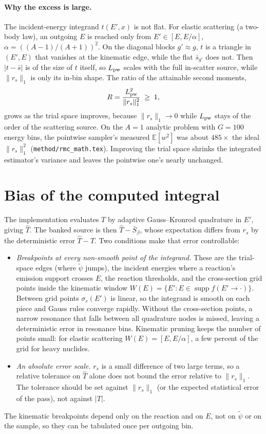 \documentclass[11pt]{article}
\newcommand{\tpsi}{\tilde\psi}
\newcommand{\Sbar}{\bar S}
\newcommand{\E}{\mathbb{E}}
\begin{document}
\paragraph{Why the excess is large.} The incident-energy integrand $t(E',x)$ is not flat.
For elastic scattering (a two-body law), an outgoing $E$ is reached only from
$E'\in[E, E/\alpha]$, $\alpha = ((A-1)/(A+1))^2$. On the diagonal blocks $g'\approx g$,
$t$ is a triangle in $(E',E)$ that vanishes at the kinematic edge, while the flat
$\bar s_{g'}$ does not. Then $|t-\bar s|$ is of the size of $t$ itself, so
$L_{\rm pw}$ scales with the full in-scatter source, while $\|r_s\|_1$ is only its
in-bin shape. The ratio of the attainable second moments,
\begin{equation}
  R = \frac{L_{\rm pw}^2}{\|r_s\|_1^2} \;\ge\; 1,
\end{equation}
grows as the trial space improves, because $\|r_s\|_1\to 0$ while $L_{\rm pw}$ stays
of the order of the scattering source. On the $A=1$ analytic problem with $G=100$
energy bins, the pointwise sampler's measured $\E[w^2]$ was about $485\times$ the ideal
$\|r_s\|_1^2$ (\texttt{method/rmc\_math.tex}). Improving the trial space shrinks the
integrated estimator's variance and leaves the pointwise one's nearly unchanged.

\section{Bias of the computed integral}

The implementation evaluates $T$ by adaptive Gauss--Kronrod quadrature in $E'$, giving
$\widehat T$. The banked source is then $\widehat T - \Sbar_\beta$, whose expectation
differs from $r_s$ by the deterministic error $\widehat T - T$. Two conditions make that
error controllable:
\begin{itemize}
  \item \emph{Breakpoints at every non-smooth point of the integrand.} These are the
  trial-space edges (where $\tpsi$ jumps), the incident energies where a reaction's
  emission support crosses $E$, the reaction thresholds, and the cross-section grid
  points inside the kinematic window $W(E)=\{E' : E\in\operatorname{supp}
  f(E'\to\cdot)\}$. Between grid points $\sigma_r(E')$ is linear, so the integrand is
  smooth on each piece and Gauss rules converge rapidly. Without the cross-section
  points, a narrow resonance that falls between all quadrature nodes is missed,
  leaving a deterministic error in resonance bins. Kinematic pruning keeps the number
  of points small: for elastic scattering $W(E)=[E, E/\alpha]$, a few percent of the
  grid for heavy nuclides.
  \item \emph{An absolute error scale.} $r_s$ is a small difference of two large terms,
  so a relative tolerance on $\widehat T$ alone does not bound the error relative to
  $\|r_s\|_1$. The tolerance should be set against $\|r_s\|_1$ (or the expected
  statistical error of the pass), not against $|T|$.
\end{itemize}
The kinematic breakpoints depend only on the reaction and on $E$, not on $\tpsi$ or on
the sample, so they can be tabulated once per outgoing bin.
\end{document}
